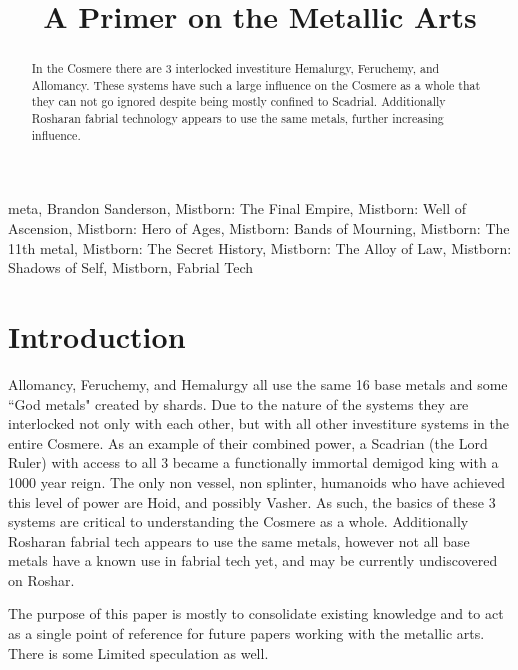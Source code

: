 \documentclass[conference]{IEEEtran}
\begin{document}
\title{A Primer on the Metallic Arts}

\author{
}

\maketitle

\begin{abstract}
In the Cosmere there are 3 interlocked investiture Hemalurgy, Feruchemy, and Allomancy.  These systems have such a large influence on the Cosmere as a whole that they can not go ignored despite being mostly confined to Scadrial.  Additionally Rosharan fabrial technology appears to use the same metals, further increasing influence.
\end{abstract}

\begin{IEEEkeywords}
meta, Brandon Sanderson, Mistborn: The Final Empire, Mistborn: Well of Ascension, Mistborn: Hero of Ages, Mistborn: Bands of Mourning, Mistborn: The 11th metal, Mistborn: The Secret History, Mistborn: The Alloy of Law, Mistborn: Shadows of Self, Mistborn, Fabrial Tech
\end{IEEEkeywords}

\section*{Introduction}
Allomancy, Feruchemy, and Hemalurgy all use the same 16 base metals and some ``God metals" created by shards.\cite{ARS} Due to the nature of the systems they are interlocked not only with each other, but with all other investiture systems in the entire Cosmere.  As an example of their combined power, a Scadrian (the Lord Ruler) with access to all 3 became a functionally immortal demigod king with a 1000 year reign.\cite{TFE}  The only non vessel, non splinter, humanoids who have achieved this level of power are Hoid, and possibly Vasher.  As such, the basics of these 3 systems are critical to understanding the Cosmere as a whole.  Additionally Rosharan fabrial tech appears to use the same metals,\cite{RoW-E7} however not all base metals have a known use in fabrial tech yet, and may be currently undiscovered on Roshar. 

The purpose of this paper is mostly to consolidate existing knowledge and to act as a single point of reference for future papers working with the metallic arts.  There is some Limited speculation as well.
\end{document}
